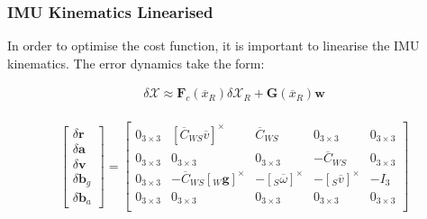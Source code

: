 \documentclass[a4paper,11pt,notitlepage]{article}
\begin{document}
 \subsubsection{IMU Kinematics Linearised}
 
 In order to optimise the cost function, it is important to linearise the IMU kinematics. The error dynamics take the form:
 
\begin{equation}
\begin{aligned}
\delta \mathcal{X} \approx  \textbf{F}_{c} (\overline{x}_{R}) \delta \mathcal{X}_{R} + \textbf{G}(\overline{x}_{R})\textbf{w} \\
\end{aligned}
\end{equation}

\begin{equation}
\begin{bmatrix}
       \delta \textbf{\.r}  \\[0.3em]
       \delta \textbf{\.a} \\[0.3em]
       \delta \textbf{\.v} \\[0.3em]
       \delta \textbf{\.b}_{g} \\[0.3em]
       \delta \textbf{\.b}_{a}
\end{bmatrix}
=
\begin{bmatrix}
       0_{3 \times 3} &  [\overline{C}_{WS}\overline{v}]^{\times}
       & \overline{C}_{WS} &  0_{3 \times 3} &  0_{3 \times 3}\\
       
       0_{3 \times 3} & 0_{3 \times 3} 
       & 0_{3 \times 3} &  -\overline{C}_{WS} &  0_{3 \times 3}\\
       
       0_{3 \times 3} & -\overline{C}_{WS}[_{W}\textbf{g}]^{\times}
       & -[_{S}\overline{\omega}]^{\times} &  -[_{S}\overline{v}]^{\times} &  -I_{3}\\
       
       0_{3 \times 3} & 0_{3 \times 3}
       & 0_{3 \times 3} &  0_{3 \times 3} &  0_{3 \times 3}\\
       

\end{bmatrix}
\end{equation}
\end{document}
